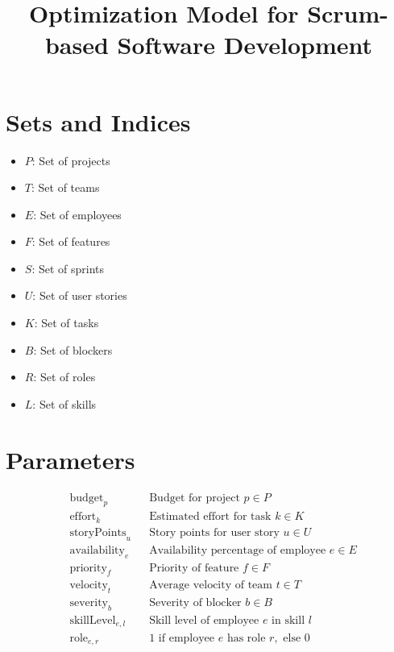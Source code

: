 \documentclass{article}
\begin{document}
\title{Optimization Model for Scrum-based Software Development}
\author{}
\date{}
\maketitle

\section*{Sets and Indices}

\begin{itemize}
    \item $P$: Set of projects
    \item $T$: Set of teams
    \item $E$: Set of employees
    \item $F$: Set of features
    \item $S$: Set of sprints
    \item $U$: Set of user stories
    \item $K$: Set of tasks
    \item $B$: Set of blockers
    \item $R$: Set of roles
    \item $L$: Set of skills
\end{itemize}

\section*{Parameters}

\begin{align*}
    & \text{budget}_p && \text{Budget for project } p \in P \\
    & \text{effort}_k && \text{Estimated effort for task } k \in K \\
    & \text{storyPoints}_u && \text{Story points for user story } u \in U \\
    & \text{availability}_e && \text{Availability percentage of employee } e \in E \\
    & \text{priority}_f && \text{Priority of feature } f \in F \\
    & \text{velocity}_t && \text{Average velocity of team } t \in T \\
    & \text{severity}_b && \text{Severity of blocker } b \in B \\
    & \text{skillLevel}_{e,l} && \text{Skill level of employee } e \text{ in skill } l \\
    & \text{role}_{e,r} && \text{1 if employee } e \text{ has role } r, \text{ else } 0 \\
\end{align*}
\end{document}

